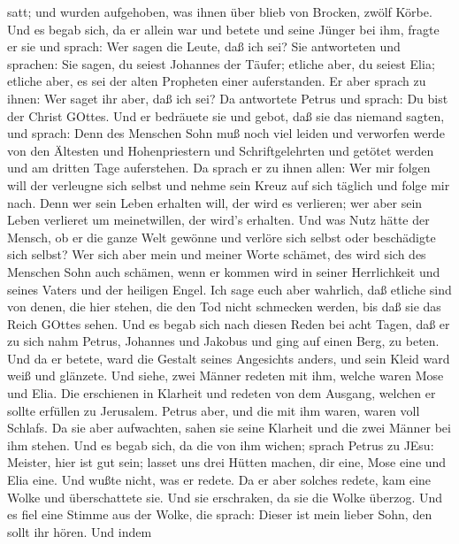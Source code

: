 satt; und wurden aufgehoben, was ihnen über blieb von Brocken, zwölf
Körbe.  Und es begab sich, da er allein war und betete und
seine Jünger bei ihm, fragte er sie und sprach: Wer sagen die Leute, daß
ich sei?  Sie antworteten und sprachen: Sie sagen, du
seiest Johannes der Täufer; etliche aber, du seiest Elia; etliche aber,
es sei der alten Propheten einer auferstanden.  Er aber
sprach zu ihnen: Wer saget ihr aber, daß ich sei? Da antwortete Petrus
und sprach: Du bist der Christ GOttes.  Und er bedräuete
sie und gebot, daß sie das niemand sagten,  und sprach:
Denn des Menschen Sohn muß noch viel leiden und verworfen werde von den
Ältesten und Hohenpriestern und Schriftgelehrten und getötet werden und
am dritten Tage auferstehen.  Da sprach er zu ihnen allen:
Wer mir folgen will der verleugne sich selbst und nehme sein Kreuz auf
sich täglich und folge mir nach.  Denn wer sein Leben
erhalten will, der wird es verlieren; wer aber sein Leben verlieret um
meinetwillen, der wird's erhalten.  Und was Nutz hätte der
Mensch, ob er die ganze Welt gewönne und verlöre sich selbst oder
beschädigte sich selbst?  Wer sich aber mein und meiner
Worte schämet, des wird sich des Menschen Sohn auch schämen, wenn er
kommen wird in seiner Herrlichkeit und seines Vaters und der heiligen
Engel.  Ich sage euch aber wahrlich, daß etliche sind von
denen, die hier stehen, die den Tod nicht schmecken werden, bis daß sie
das Reich GOttes sehen.  Und es begab sich nach diesen
Reden bei acht Tagen, daß er zu sich nahm Petrus, Johannes und Jakobus
und ging auf einen Berg, zu beten.  Und da er betete, ward
die Gestalt seines Angesichts anders, und sein Kleid ward weiß und
glänzete.  Und siehe, zwei Männer redeten mit ihm, welche
waren Mose und Elia.  Die erschienen in Klarheit und
redeten von dem Ausgang, welchen er sollte erfüllen zu Jerusalem.
 Petrus aber, und die mit ihm waren, waren voll Schlafs. Da
sie aber aufwachten, sahen sie seine Klarheit und die zwei Männer bei
ihm stehen.  Und es begab sich, da die von ihm wichen;
sprach Petrus zu JEsu: Meister, hier ist gut sein; lasset uns drei
Hütten machen, dir eine, Mose eine und Elia eine. Und wußte nicht, was
er redete.  Da er aber solches redete, kam eine Wolke und
überschattete sie. Und sie erschraken, da sie die Wolke überzog.
 Und es fiel eine Stimme aus der Wolke, die sprach: Dieser
ist mein lieber Sohn, den sollt ihr hören.  Und indem
